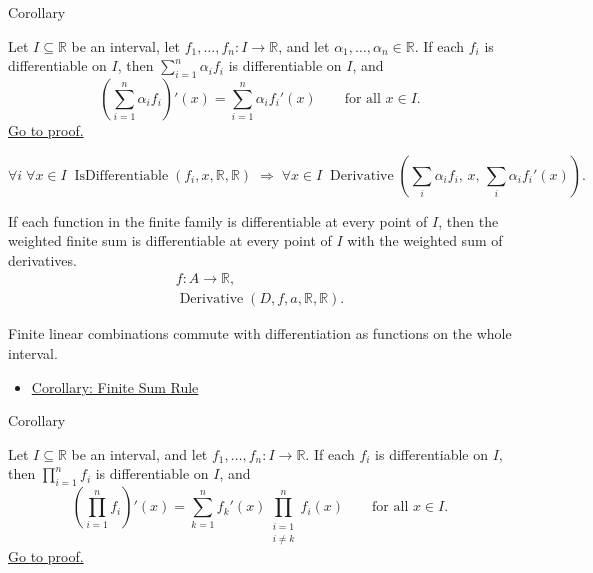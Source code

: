 \begin{corollarybox}{Corollary}
\begin{corollary}
\label{cor:finite-sum-rule-interval}
Let $I \subseteq \mathbb{R}$ be an interval, let $f_1, \dots, f_n : I \to \mathbb{R}$, and let $\alpha_1, \dots, \alpha_n \in \mathbb{R}$. If each $f_i$ is differentiable on $I$, then $\sum_{i=1}^{n} \alpha_i f_i$ is differentiable on $I$, and
\[
\left(\sum_{i=1}^{n} \alpha_i f_i\right)'(x) = \sum_{i=1}^{n} \alpha_i f_i'(x) \qquad \text{for all } x \in I.
\]
\hyperref[prf:finite-sum-rule-interval]{Go to proof.}
\end{corollary}
\end{corollarybox}

\begin{remark*}
\[
\forall i\;\forall x\in I\;\operatorname{IsDifferentiable}(f_i,x,\mathbb{R},\mathbb{R})
\;\Rightarrow\;
\forall x\in I\;\operatorname{Derivative}\!\left(\textstyle\sum_i\alpha_i f_i,\,x,\,\textstyle\sum_i\alpha_i f_i'(x)\right).
\]
\end{remark*}

\begin{remark*}
If each function in the finite family is differentiable at every point of
$I$, then the weighted finite sum is differentiable at every point of $I$ with
the weighted sum of derivatives.
\[
\begin{aligned}
  f\colon A\to\mathbb{R},\\
  \operatorname{Derivative}(D,f,a,\mathbb{R},\mathbb{R}).
\end{aligned}
\]
\end{remark*}

\begin{remark*}[Interpretation]
Finite linear combinations commute with differentiation as functions on the whole interval.
\end{remark*}

\begin{dependencies}
\begin{itemize}
  \item \hyperref[cor:finite-sum-rule]{Corollary: Finite Sum Rule}
\end{itemize}
\end{dependencies}


\begin{corollarybox}{Corollary}
\begin{corollary}
\label{cor:extended-product-rule-interval}
Let $I \subseteq \mathbb{R}$ be an interval, and let $f_1, \dots, f_n : I \to \mathbb{R}$. If each $f_i$ is differentiable on $I$, then $\prod_{i=1}^{n} f_i$ is differentiable on $I$, and
\[
\left(\prod_{i=1}^{n} f_i\right)'(x)
= \sum_{k=1}^{n} f_k'(x) \prod_{\substack{i=1\\i\neq k}}^{n} f_i(x)
\qquad \text{for all } x \in I.
\]
\hyperref[prf:extended-product-rule-interval]{Go to proof.}
\end{corollary}
\end{corollarybox}


